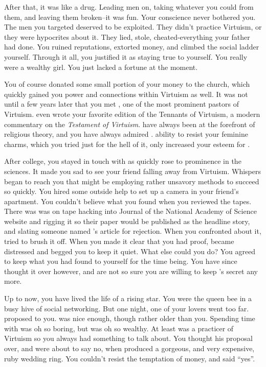 \documentclass[char]{guildcamp1}
\begin{document}
After that, it was like a drug. Leading men on, taking whatever you could from them, and leaving them broken--it was fun. Your conscience never bothered you. The men you targeted deserved to be exploited. They didn't practice Virtuism, or they were hypocrites about it. They lied, stole, cheated-everything your father had done. You ruined reputations, extorted money, and climbed the social ladder yourself. Through it all, you justified it as staying true to yourself. You really were a wealthy girl. You just lacked a fortune at the moment.  

You of course donated some small portion of your money to the church, which quickly gained you power and connections within Virtuism as well. It was not until a few years later that you met \cPastor{}, one of the most prominent pastors of Virtuism. \cPastor{\They} even wrote your favorite edition of the Tennants of Virtuism, a modern commentary on the {\it Testament of Virtuism}. \cPastor{\They} have always been at the forefront of religious theory, and you have always admired \cPastor{\them}. \cPastor{\them} ability to resist your feminine charms, which you tried just for the hell of it, only increased your esteem for \cPastor{}. 

After college, you stayed in touch with \cRival{} as \cRival{\they} quickly rose to prominence in the sciences. It made you sad to see your friend falling away from Virtuism. Whispers began to reach you that \cRival{} might be employing rather unsavory methods to succeed so quickly. You hired some outside help to set up a camera in your friend's apartment. You couldn't believe what you found when you reviewed the tapes. There was \cRival{} was on tape hacking into Journal of the National Academy of Science website and rigging it so their paper would be published as the headline story, and slating someone named \cScientist{}'s article for rejection. When you confronted \cRival{\them} about it, \cRival{\they} tried to brush it off. When you made it clear that you had proof, \cRival{} became distressed and begged you to keep it quiet.  What else could you do? You agreed to keep what you had found to yourself for the time being. You have since thought it over however, and are not so sure you are willing to keep \cRival{}'s secret any more.

Up to now, you have lived the life of a rising star. You were the queen bee in a busy hive of social networking. But one night, one of your lovers went too far. \cGroomA{} proposed to you. \cGroomA{\They} was nice enough, though rather older than you. Spending time with \cGroomA{\them} was oh so boring, but \cGroomA{\they} was oh so wealthy. At least \cGroomA{\they} was  a practicer of Virtuism so you always had something to talk about. You thought his proposal over, and were about to say no, when \cGroomA{\they} produced a gorgeous, and very expensive, ruby wedding ring. You couldn't resist the temptation of money, and said ``yes''.
\end{document}
